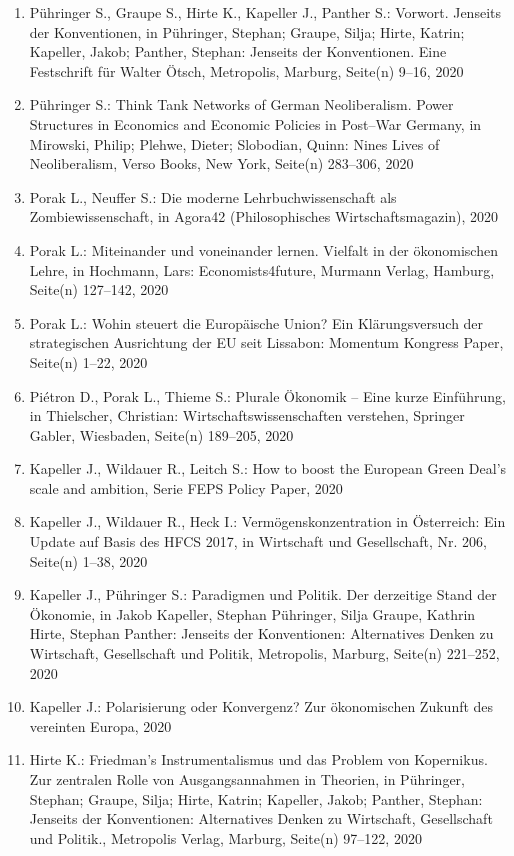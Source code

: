 \begin{enumerate}
	 \item Pühringer S., Graupe S., Hirte K., Kapeller J., Panther S.: Vorwort. Jenseits der Konventionen, in Pühringer, Stephan; Graupe, Silja; Hirte, Katrin; Kapeller, Jakob; Panther, Stephan: Jenseits der Konventionen. Eine Festschrift für Walter Ötsch, Metropolis, Marburg, Seite(n) 9--16, 2020
	 \item Pühringer S.: Think Tank Networks of German Neoliberalism. Power Structures in Economics and Economic Policies in Post--War Germany, in Mirowski, Philip; Plehwe, Dieter; Slobodian, Quinn: Nines Lives of Neoliberalism, Verso Books, New York, Seite(n) 283--306, 2020
	 \item Porak L., Neuffer S.: Die moderne Lehrbuchwissenschaft als Zombiewissenschaft, in Agora42 (Philosophisches Wirtschaftsmagazin), 2020
	 \item Porak L.: Miteinander und voneinander lernen. Vielfalt in der ökonomischen Lehre, in Hochmann, Lars: Economists4future, Murmann Verlag, Hamburg, Seite(n) 127--142, 2020
	 \item Porak L.: Wohin steuert die Europäische Union? Ein Klärungsversuch der strategischen Ausrichtung der EU seit Lissabon: Momentum Kongress Paper, Seite(n) 1--22, 2020
	 \item Piétron D., Porak L., Thieme S.: Plurale Ökonomik -- Eine kurze Einführung, in Thielscher, Christian: Wirtschaftswissenschaften verstehen, Springer Gabler, Wiesbaden, Seite(n) 189--205, 2020
	 \item Kapeller J., Wildauer R., Leitch S.: How to boost the European Green Deal’s scale and ambition, Serie FEPS Policy Paper, 2020
	 \item Kapeller J., Wildauer R., Heck I.: Vermögenskonzentration in Österreich: Ein Update auf Basis des HFCS 2017, in Wirtschaft und Gesellschaft, Nr. 206, Seite(n) 1--38, 2020
	 \item Kapeller J., Pühringer S.: Paradigmen und Politik. Der derzeitige Stand der Ökonomie, in Jakob Kapeller, Stephan Pühringer, Silja Graupe, Kathrin Hirte, Stephan Panther: Jenseits der Konventionen: Alternatives Denken zu Wirtschaft, Gesellschaft und Politik, Metropolis, Marburg, Seite(n) 221--252, 2020
	 \item Kapeller J.: Polarisierung oder Konvergenz? Zur ökonomischen Zukunft des vereinten Europa, 2020
	 \item Hirte K.: Friedman’s Instrumentalismus und das Problem von Kopernikus. Zur zentralen Rolle von Ausgangsannahmen in Theorien, in Pühringer, Stephan; Graupe, Silja; Hirte, Katrin; Kapeller, Jakob; Panther, Stephan: Jenseits der Konventionen: Alternatives Denken zu Wirtschaft, Gesellschaft und Politik., Metropolis Verlag, Marburg, Seite(n) 97--122, 2020

\end{enumerate}
